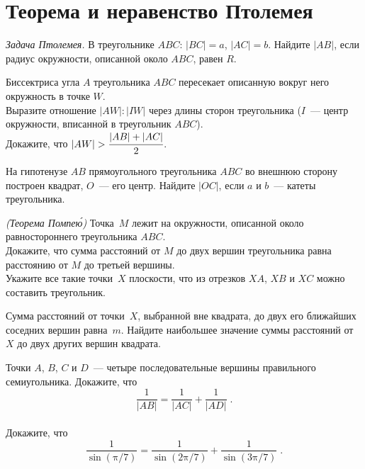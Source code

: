
\section*{Теорема и неравенство Птолемея}


\begin{problems}

\item\emph{Задача Птолемея.}
В треугольнике $ABC$: $\lvert BC \rvert = a$, $\lvert AC \rvert = b$.
Найдите $\lvert AB \rvert$, если радиус окружности, описанной около $ABC$,
равен $R$.

\item
Биссектриса угла $A$ треугольника $ABC$ пересекает описанную вокруг него
окружность в точке $W$.
\\
\subproblem
Выразите отношение $\lvert AW \rvert : \lvert IW \rvert$ через длины сторон
треугольника ($I$~— центр окружности, вписанной в треугольник $ABC$).
\\[0.5ex]
\subproblem
Докажите, что
\(
    \lvert AW \rvert
>
    \cfrac{\lvert AB \rvert + \lvert AC \rvert}{2}
\).

\item
На гипотенузе $AB$ прямоугольного треугольника $ABC$ во внешнюю сторону
построен квадрат, $O$~— его центр.
Найдите $\lvert OC \rvert$, если $a$ и $b$~— катеты треугольника.


\item\emph{(Теорема Помпе\'{ю})}
Точка~$M$ лежит на окружности, описанной около равностороннего
треугольника $ABC$.
\\
\subproblem
Докажите, что сумма расстояний от $M$ до двух вершин треугольника равна
расстоянию от $M$ до третьей вершины.
\\
\subproblem
Укажите все такие точки~$X$ плоскости, что из отрезков $XA$, $XB$ и $XC$ можно
составить треугольник.

\item
Сумма расстояний от точки~$X$, выбранной вне квадрата, до двух его ближайших
соседних вершин равна~$m$.
Найдите наибольшее значение суммы расстояний от $X$ до двух других вершин
квадрата.

\item
\subproblem
Точки $A$, $B$, $C$ и $D$~— четыре последовательные вершины правильного
семиугольника.
Докажите, что
\[
    \frac{1}{\lvert AB \rvert}
=
    \frac{1}{\lvert AC \rvert} + \frac{1}{\lvert AD \rvert}
\; . \]
\\
\subproblem
Докажите, что
\[
    \frac{1}{\sin (\mathrm{\pi} / 7)}
=
    \frac{1}{\sin (2 \mathrm{\pi} / 7)}
    +
    \frac{1}{\sin (3 \mathrm{\pi} / 7)}
\; . \]


\end{problems}
